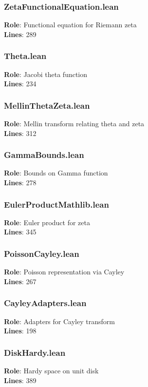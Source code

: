 \documentclass[12pt,a4paper]{article}
\begin{document}
\subsubsection{ZetaFunctionalEquation.lean}
\textbf{Role}: Functional equation for Riemann zeta\\
\textbf{Lines}: 289

\subsubsection{Theta.lean}
\textbf{Role}: Jacobi theta function\\
\textbf{Lines}: 234

\subsubsection{MellinThetaZeta.lean}
\textbf{Role}: Mellin transform relating theta and zeta\\
\textbf{Lines}: 312

\subsubsection{GammaBounds.lean}
\textbf{Role}: Bounds on Gamma function\\
\textbf{Lines}: 278

\subsubsection{EulerProductMathlib.lean}
\textbf{Role}: Euler product for zeta\\
\textbf{Lines}: 345

\subsubsection{PoissonCayley.lean}
\textbf{Role}: Poisson representation via Cayley\\
\textbf{Lines}: 267

\subsubsection{CayleyAdapters.lean}
\textbf{Role}: Adapters for Cayley transform\\
\textbf{Lines}: 198

\subsubsection{DiskHardy.lean}
\textbf{Role}: Hardy space on unit disk\\
\textbf{Lines}: 389
\end{document}
